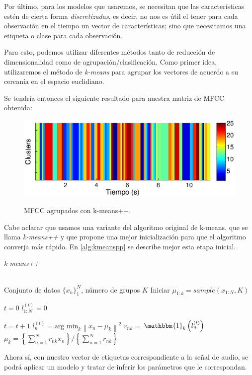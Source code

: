 Por último, para los modelos que usaremos, se necesitan que las características estén de cierta forma \textit{discretizadas}, es decir, no nos es útil el tener para cada observación en el tiempo un vector de características; sino que necesitamos una etiqueta o clase para cada observación. 

Para esto, podemos utilizar diferentes métodos tanto de reducción de dimensionalidad como de agrupación/clasificación. Como primer idea, utilizaremos el método de \textit{k-means} para agrupar los vectores de acuerdo a su cercanía en el espacio euclidiano.

Se tendría entonces el siguiente resultado para nuestra matriz de MFCC obtenida:
\begin{figure}[t]
  \myfloatalign
  {\includegraphics[width=0.9\linewidth]{gfx/chap2/mfcc_result4}} \quad
  \caption{MFCC agrupados con k-means++.}
  \label{fig:sign_clusters}
\end{figure}
Cabe aclarar que usamos una variante del algoritmo original de k-means, que se llama \textit{k-means++} \cite{Arthur2007} y que propone una mejor inicialización para que el algoritmo converja más rápido. En \autoref{alg:kmeanspp} se describe mejor esta etapa inicial.

\begin{algorithm}[bth]
   \caption{\textit{k-means++}}
   \label{alg:kmeanspp}
\begin{algorithmic}
    \\ Conjunto de datos $\lbrace x_n \rbrace_1^N $, número de grupos $K$
   \STATE Iniciar $\mu_{1:k} = sample(x_{1:N}, K)$   
   
   \STATE $t = 0$
   \STATE $l_{1:N}^{(t)} = 0$
      
   \REPEAT  
   \STATE $t=t+1$ 
   \STATE $l_n^{(t)} = \text{arg min}_k {\left \| x_n - \mu_k \right \|}^2 $
   \STATE $r_{nk}$ = $\mathbbm{1}_k\left(l_n^{(t)}\right)$
   \STATE $\mu_k = \left\lbrace {\sum_{n=1}^N r_{nk} x_n} \right\rbrace / \left\lbrace {\sum_{n=1}^N r_{nk}} \right\rbrace $
\end{algorithmic}
\end{algorithm}

Ahora sí, con nuestro vector de etiquetas correspondiente a la señal de audio, se podrá aplicar un modelo y tratar de inferir los parámetros que le correspondan.


